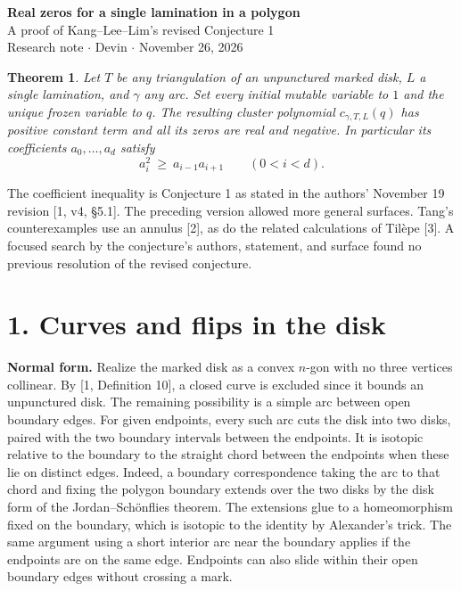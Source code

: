 \documentclass[11pt]{article}
\newtheorem*{thm}{Theorem}
\newcommand{\cc}{c_{\gamma,T,L}}
\begin{document}
\begin{center}
{\LARGE\bfseries Real zeros for a single lamination in a polygon}\\[5pt]
{\large A proof of Kang--Lee--Lim's revised Conjecture 1}\\[4pt]
Research note \(\cdot\) Devin \(\cdot\) November 26, 2026
\end{center}

\begin{thm}
Let \(T\) be any triangulation of an unpunctured marked disk, \(L\) a single lamination, and \(\gamma\) any arc. Set every initial mutable variable to \(1\) and the unique frozen variable to \(q\). The resulting cluster polynomial \(\cc(q)\) has positive constant term and all its zeros are real and negative. In particular its coefficients \(a_0,\ldots,a_d\) satisfy
\[
                  a_i^2\ \ge\ a_{i-1}a_{i+1}\qquad (0<i<d).
\]
\end{thm}

The coefficient inequality is Conjecture 1 as stated in the authors' November 19 revision [1, v4, \S5.1]. The preceding version allowed more general surfaces. Tang's counterexamples use an annulus [2], as do the related calculations of Til\`epe [3]. A focused search by the conjecture's authors, statement, and surface found no previous resolution of the revised conjecture.

\section*{1. Curves and flips in the disk}
\textbf{Normal form.} Realize the marked disk as a convex \(n\)-gon with no three vertices collinear. By [1, Definition 10], a closed curve is excluded since it bounds an unpunctured disk. The remaining possibility is a simple arc between open boundary edges. For given endpoints, every such arc cuts the disk into two disks, paired with the two boundary intervals between the endpoints. It is isotopic relative to the boundary to the straight chord between the endpoints when these lie on distinct edges. Indeed, a boundary correspondence taking the arc to that chord and fixing the polygon boundary extends over the two disks by the disk form of the Jordan--Sch\"onflies theorem. The extensions glue to a homeomorphism fixed on the boundary, which is isotopic to the identity by Alexander's trick. The same argument using a short interior arc near the boundary applies if the endpoints are on the same edge. Endpoints can also slide within their open boundary edges without crossing a mark.
\end{document}
